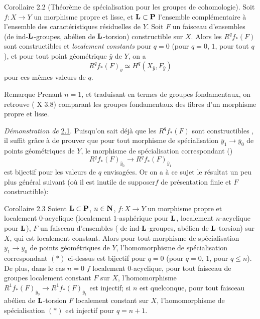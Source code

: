 \documentclass[10pt]{../fichiers-configuration-latex/smfart}
\begin{document}
\begin{enonce*}{Corollaire 2.2}
(Théorème de spécialisation pour les groupes de cohomologie). Soit
  $f:X\rightarrow Y$ un morphisme propre et lisse, et
  $\mathbf{L}\subset \mathbf{P}$ l'ensemble complémentaire à
  l'ensemble des caractéristiques résiduelles de $Y$. Soit $F$ un
  faisceau d'ensembles (\resp de ind-$\mathbf{L}$-groupes, \resp
  abélien de $\mathbf{L}$-torsion) constructible sur $X$. Alors les
  $R^{q}f_{\ast}(F)$ sont constructibles et \emph{localement
  constants} pour $q=0$ (\resp pour $q=0$, $1$, \resp pour tout $q$),
  et pour tout point géométrique $\bar{y}$ de $Y$, on a
$$
R^{q}f_{\ast}(F)_{\bar{y}}\simeq H^{q}(X_{\bar{y}},F_{\bar{y}})
$$
pour ces mêmes valeurs de $q$.
\end{enonce*}

\begin{enonce*}[remark]{Remarque}
Prenant $n=1$, et traduisant en termes de groupes fondamentaux, on
retrouve ( X 3.8) comparant les groupes fondamentaux des fibres
d'un morphisme propre et lisse.
\end{enonce*}

\noindent
\emph{Démonstration de} \hyperref[XVI.thm2.1]{2.1}. Puisqu'on sait déjà que les
$R^{q}f_{\ast}(F)$ sont constructibles , il suffit grâce à 
 de prouver que pour tout morphisme de spécialisation
$\bar{y}_1\rightarrow \bar{y}_{0}$ de points géométriques de $Y$,
le morphisme de spécialisation correspondant ()
\begin{equation*}
R^{q}f_{\ast}(F)_{\bar{y}_{0}}\longrightarrow
R^{q}f_{\ast}(F)_{\bar{y}_1}\tag{$\ast$}
\end{equation*}
est bijectif pour les valeurs de $q$ envisagées. Or on a à ce sujet le
résultat un peu plus général suivant (où il est inutile de
supposer\pageoriginale $f$ de présentation finie et $F$ constructible):

\begin{enonce*}{Corollaire 2.3}
Soient $\mathbf{L}\subset \mathbf{P}$, $n\in \mathbf{N}$,
$f:X\rightarrow Y$ un morphisme propre et localement $0$-acyclique
(\resp localement $1$-asphérique pour $\mathbf{L}$, \resp localement
$n$-acyclique pour $\mathbf{L}$), $F$ un faisceau d'ensembles (\resp
de ind-$\mathbf{L}$-groupes, \resp abélien de $\mathbf{L}$-torsion)
sur $X$, qui est localement constant. Alors pour tout morphisme de
spécialisation $\bar{y}_1\rightarrow \bar{y}_0$ de points géométriques
de $Y$, l'homomorphisme de spécialisation correspondant $(\ast)$
ci-dessus est bijectif pour $q=0$ (\resp pour $q=0$, $1$, \resp pour
$q\leq n$). De plus, dans le cas $n=0$ \ie $f$ localement
$0$-acyclique, pour tout faisceau de groupes localement constant $F$
sur $X$, l'homomorphisme $R^{1}f_{\ast}(F)_{\bar{y}_0}\rightarrow
R^{1}f_{\ast}(F)_{\bar{y}_1}$ est injectif; si $n$ est quelconque,
pour tout faisceau abélien de $\mathbf{L}$-torsion $F$ localement
constant sur $X$, l'homomorphisme de spécialisation $(\ast)$ est
injectif pour $q=n+1$.
\end{enonce*}
\end{document}
